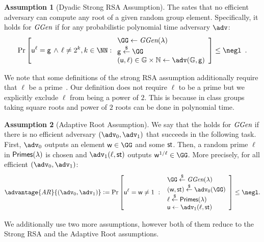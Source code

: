 \documentclass{article}
\theoremstyle{definition}
\newtheorem{assumption}{Assumption}
\begin{document}
\begin{assumption}[Dyadic Strong RSA Assumption]
\label{assum:strongRSA}
The  sates that no efficient adversary can compute any root of a given random group element. Specifically, it holds for $\textit{GGen}$ if for any probabilistic polynomial time adversary $\adv$:
\[
    \Pr\left[\gr{u}^\ell = \gr{g} \, \wedge \, \ell\neq 2^k, k \in \NN:
    \begin{array}{l}
         \GG \leftarrow \ggen(\lambda)  \\
         \gr{g} \sample \GG \\
         (\gr{u}, \ell) \in \mathbb{G} \times \mathbb{N} \leftarrow \adv(\mathbb{G}, \gr{g}) \\
    \end{array}\right] \leq \negl \enspace .
\]
\end{assumption} 
We note that some definitions of the strong RSA assumption additionally require that $\ell$ be a prime~\cite{EC:BarPfi97}. Our definition does not require $\ell$ to be a prime but we explicitly exclude $\ell$ from being a power of $2$. This is because in class groups taking square roots and power of $2$ roots can be done in polynomial time\cite{bosma1996computation}.
\begin{assumption}[Adaptive Root Assumption]
\label{assum:adaptiveroot}
We say that the  holds for $\textit{GGen}$ if 
there is no efficient adversary $(\adv_0,\adv_1)$ that succeeds 
in the following task.
First, $\adv_0$ outputs an element $\gr{w} \in \GG$ and some $\textsf{st}$.
Then, a random prime $\ell$ in $\textsf{Primes}(\lambda)$ is chosen
and $\adv_1(\ell,\state)$ outputs $\gr{w}^{1/\ell} \in \GG$.
More precisely, for all efficient $(\adv_0,\adv_1)$:
\[           \advantage{AR}{(\adv_0,\adv_1)}\deq 
                \Pr\left[\gr{u}^\ell = \gr{w} \neq 1 \ : \ 
                \begin{array}{l}
                      \GG \sample \ggen(\lambda) \\ 
                      (\gr{w},\state) \sample \adv_0(\GG) \\
                      \ell \sample \primes \\ 
                      \gr{u} \gets \adv_1(\ell, \state)
                \end{array} 
        \right] \leq \negl.
\]
\end{assumption}

We additionally use two more assumptions, however both of them reduce to the Strong RSA and the Adaptive Root assumptions.
\end{document}
